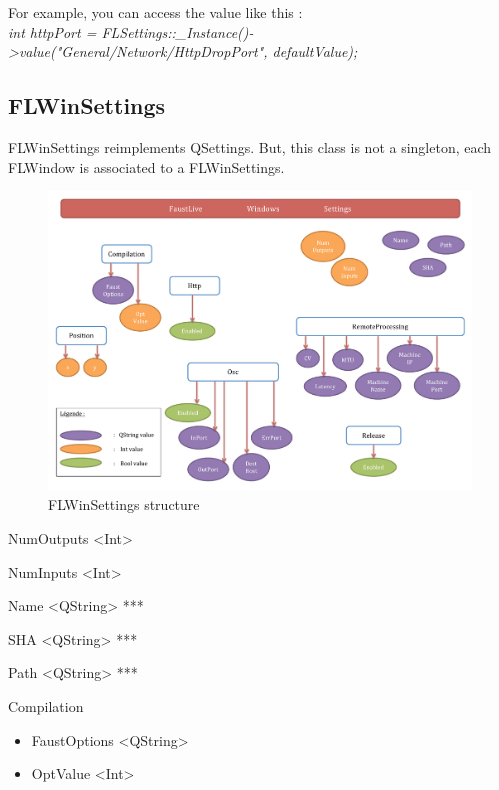 \documentclass[a4paper]{article}
\begin{document}
{ 
For example, you can access the value like this :\\
\textit{int httpPort = FLSettings::\_Instance()->value("General/Network/HttpDropPort", defaultValue);}

\subsection{FLWinSettings}

FLWinSettings reimplements QSettings. But, this class is not a singleton, each FLWindow is associated to a FLWinSettings. 

\begin{figure}[!h]
\begin{center}
\includegraphics[width=\columnwidth]{images/FLWinSettings}
\caption{FLWinSettings structure}
\label{fig:FLWinSettings}
\end{center}
\end{figure}

\begin{itemize}
\begin{multicols}{2}
\item NumOutputs <Int>
\item NumInputs <Int>
\item Name <QString> ***
\item SHA <QString> ***
\item Path <QString> ***

\item Compilation
	\begin{itemize}
		\item FaustOptions <QString>
		\item OptValue <Int>
	\end{itemize}


\end{multicols}
\end{itemize}}
\end{document}
